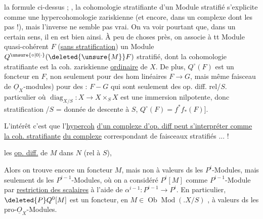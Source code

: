la formule ci-dessus ;  , la cohomologie stratifiante d'un Module stratifié s'explicite comme une hypercohomologie zariskienne (et encore, dans un complexe dont les    pas  !),  mais l'inverse ne semble \reversemarginpar\margin{\hfill\raisebox{-10\baselineskip}[0pt][0pt]{\rule{.4pt}{10\baselineskip}}}\normalmarginpar pas vrai. On va voir pourtant que, dans un certain sens, il en est bien ainsi. À peu de choses près, on associe à tt Module quasi-cohérent $F$ (\uline{sans stratification}) un Module   $Q^{\unsure{\circ|0|\cdot}}(\deleted{\unsure{M}}F)$ stratifié, dont la cohomologie stratifiante est la coh. zariskienne \uline{ordinaire} de $X$. De plus, $Q^\circ(F)$ est un foncteur en $F$, non seulement pour des hom linéaires $F\to G$, mais même   faisceau  de $\underline O_X$-modules) pour des   : $F\mathbin{-}G$ qui sont seulement des op. diff. rel/$S$.  \inserted{[-- Dans le cas très} particulier où $\operatorname{diag}_{X/S}:X\longrightarrow X\mathbin{\times}_S X$ est une immersion nilpotente, donc  stratification /$S$ = donnée de descente à $S$, $Q^\circ(F)=f^*f_*(F)$].

L'intérêt  c'est que l'\uline{hypercoh}  \uline{d'un complexe d'op. diff peut s'interpréter comme la coh. stratifiante} \uline{du complexe} correspondant de faisceaux stratifiés ... !

les \uline{op. diff.} de $M$ dans $N$ (rel à $S$),

Alors on trouve encore un foncteur   $M$, mais  non à valeurs ds les $P^i$-Modules, mais  seulement ds les $P^{i-1}$-Modules, où on a considéré $P^i[M]$ comme $P^{i-1}$-Module par \uline{restriction des scalaires} à l'aide de $\alpha^{i-1}:P^{i-1}\longrightarrow P^i$.  En particulier, $\deleted{P}Q^0[M]$ est  un foncteur, en $M\in\operatorname{Ob}\operatorname{Mod}(.X/S)$ , à valeurs ds les pro-$\underline O_X$-Modules.
\margin{et qu'on utilise comme morphismes \unsure{de|des} \deleted{\unsure{objets|Modules}} \unsure{$\mathbb N$-pro-objets|N-pro-objets} ceux de Artin--Riesz, \unsure{Supposant|exprimant} qu'on ne considère que des op. diff de degré borné, ce qui est autom. si $X$ qu. cpct].}

